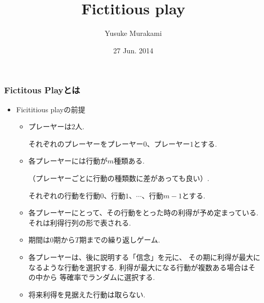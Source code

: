 \documentclass[dvipdfmx,fleqn]{beamer}
\title{\Large Fictitious play}
\author{\large Yusuke Murakami}
\date{\small 27 Jun. 2014}
\begin{document}
\sffamily
\gtfamily


\begin{frame}
  \titlepage
  \thispagestyle{empty}
\end{frame}

\setcounter{framenumber}{0}

\begin{frame}
\frametitle{Fictitous Playとは}
\begin{itemize}\setlength{\parskip}{0.5em}
\item
Ficititious playの前提

	\begin{itemize}\setlength{\parskip}{0.5em}
 	\item
	プレーヤーは$2$人.
	
	それぞれのプレーヤーをプレーヤー$0$、プレーヤー$1$とする.
	
	\item
	各プレーヤーには行動が$m$種類ある.
	
	（プレーヤーごとに行動の種類数に差があっても良い）.
	
	それぞれの行動を行動$0$、行動$1$、$\cdots$、行動$m-1$とする.
	
	\item
	各プレーヤーにとって、その行動をとった時の利得が予め定まっている.
	それは利得行列の形で表される.
	
	\item
	期間は$0$期から$T$期までの繰り返しゲーム.
	
	\item
	各プレーヤーは、後に説明する「信念」を元に、
	その期に利得が最大になるような行動を選択する.
	利得が最大になる行動が複数ある場合はその中から
	等確率でランダムに選択する.
	
	\item
	将来利得を見据えた行動は取らない.
	
	\end{itemize}

\end{itemize}
\end{frame}
\end{document}
